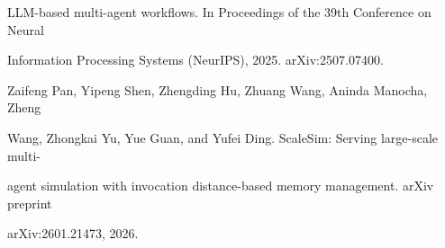 \begin{flushleft}
\noindent  LLM-based multi-agent workflows. In Proceedings of the 39th Conference on Neural\par
\noindent  Information Processing Systems (NeurIPS), 2025. arXiv:2507.07400.\par
\noindent [28] Zaifeng Pan, Yipeng Shen, Zhengding Hu, Zhuang Wang, Aninda Manocha, Zheng\par
\noindent  Wang, Zhongkai Yu, Yue Guan, and Yufei Ding. ScaleSim: Serving large-scale multi-\par
\noindent  agent simulation with invocation distance-based memory management. arXiv preprint\par
\noindent  arXiv:2601.21473, 2026.\par
\end{flushleft}
